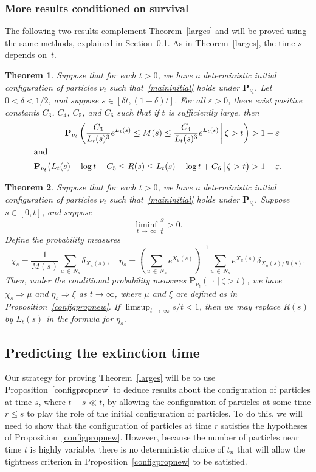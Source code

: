 \documentclass[10pt]{amsart}
\newtheorem{theo}{Theorem}[section]
\theoremstyle{definition}\newtheorem{defi}[theo]{Definition}\newtheorem{rema}[theo]{Remark}\newtheorem{exam}[theo]{Example}\newtheorem{exem}[theo]{Example}\newtheorem{nota}[theo]{Notation}
\newcommand*\eps{\varepsilon}
\renewcommand*\P{\mathbf{P}}
\newcommand{\1} {\mathds{1}}
\begin{document}
\subsubsection*{More results conditioned on survival}
The following two results complement Theorem~\ref{larges} and will be proved using the same methods, explained in Section~\ref{sec:predicting}. As in Theorem~\ref{larges}, the time $s$ depends on~$t$.

\begin{theo}\label{meds}
Suppose that for each $t > 0$, we have a deterministic initial configuration of particles $\nu_t$ such that~\eqref{maininitial} holds under $\P_{\nu_t}$. Let $0 < \delta < 1/2$, and suppose $s \in [\delta t, (1 - \delta) t]$. For all $\eps > 0$, there exist positive constants $C_3$, $C_4$, $C_5$, and $C_6$ such that if $t$ is sufficiently large, then
\begin{align*}
\P_{\nu_t} \left(\frac{C_3}{L_t(s)^3} e^{L_t(s)} \leq M(s) \leq \frac{C_4}{L_t(s)^3} e^{L_t(s)} \,\middle|\, \zeta > t \right) &> 1 - \eps
\\
\intertext{and}
\P_{\nu_t}\big(L_t(s) - \log t - C_5 \leq R(s) \leq L_t(s) - \log t + C_6 \,\big|\, \zeta > t\big) &> 1 - \eps.
\end{align*}
\end{theo}

\begin{theo}\label{condconfigprop}
Suppose that for each $t > 0$, we have a deterministic initial configuration of particles $\nu_t$ such that~\eqref{maininitial} holds under $\P_{\nu_t}$.
Suppose $s \in [0, t]$, and suppose
\[
\liminf_{t\,\rightarrow\,\infty} \frac{s}{t} > 0.
\]
Define the probability measures
\[
\chi_s = \frac{1}{M(s)} \sum_{u\,\in\,N_s} \delta_{X_u(s)}, \quad \eta_s = \left(\sum_{u\,\in\,N_s} e^{X_u(s)} \right)^{-1} \sum_{u\,\in\,N_s} e^{X_u(s)} \delta_{X_u(s)/R(s)}.
\]
Then, under the conditional probability measures $\P_{\nu_t}(\:\cdot\:|\,\zeta > t)$, we have $\chi_s \Rightarrow \mu$ and $\eta_s \Rightarrow \xi$ as $t \rightarrow \infty$, where $\mu$ and $\xi$ are defined as in Proposition~\ref{configpropnew}. If $\limsup_{t \,\rightarrow\,\infty} s/t < 1$, then we may replace $R(s)$ by $L_t(s)$ in the formula for $\eta_s$.
\end{theo}

\subsection{Predicting the extinction time}\label{sec:predicting}
Our strategy for proving Theorem~\ref{larges} will be to use Proposition~\ref{configpropnew} to deduce results about the configuration of particles at time $s$, where $t - s \ll t$, by allowing the configuration of particles at some time $r \leq s$ to play the role of the initial configuration of particles. To do this, we will need to show that the configuration of particles at time $r$ satisfies the hypotheses of Proposition~\ref{configpropnew}. However, because the number of particles near time $t$ is highly variable, there is no deterministic choice of $t_n$ that will allow the tightness criterion in Proposition~\ref{configpropnew} to be satisfied.
\end{document}
